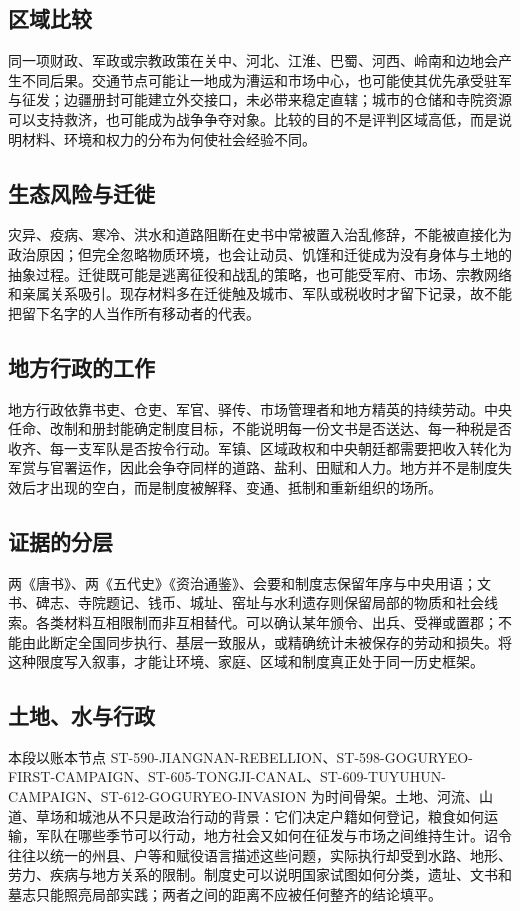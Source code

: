 \subsection{区域比较}
同一项财政、军政或宗教政策在关中、河北、江淮、巴蜀、河西、岭南和边地会产生不同后果。交通节点可能让一地成为漕运和市场中心，也可能使其优先承受驻军与征发；边疆册封可能建立外交接口，未必带来稳定直辖；城市的仓储和寺院资源可以支持救济，也可能成为战争争夺对象。比较的目的不是评判区域高低，而是说明材料、环境和权力的分布为何使社会经验不同。

\subsection{生态风险与迁徙}
灾异、疫病、寒冷、洪水和道路阻断在史书中常被置入治乱修辞，不能被直接化为政治原因；但完全忽略物质环境，也会让动员、饥馑和迁徙成为没有身体与土地的抽象过程。迁徙既可能是逃离征役和战乱的策略，也可能受军府、市场、宗教网络和亲属关系吸引。现存材料多在迁徙触及城市、军队或税收时才留下记录，故不能把留下名字的人当作所有移动者的代表。

\subsection{地方行政的工作}
地方行政依靠书吏、仓吏、军官、驿传、市场管理者和地方精英的持续劳动。中央任命、改制和册封能确定制度目标，不能说明每一份文书是否送达、每一种税是否收齐、每一支军队是否按令行动。军镇、区域政权和中央朝廷都需要把收入转化为军赏与官署运作，因此会争夺同样的道路、盐利、田赋和人力。地方并不是制度失效后才出现的空白，而是制度被解释、变通、抵制和重新组织的场所。

\subsection{证据的分层}
两《唐书》、两《五代史》《资治通鉴》、会要和制度志保留年序与中央用语；文书、碑志、寺院题记、钱币、城址、窑址与水利遗存则保留局部的物质和社会线索。各类材料互相限制而非互相替代。可以确认某年颁令、出兵、受禅或置郡；不能由此断定全国同步执行、基层一致服从，或精确统计未被保存的劳动和损失。将这种限度写入叙事，才能让环境、家庭、区域和制度真正处于同一历史框架。
\subsection{土地、水与行政}
本段以账本节点 ST-590-JIANGNAN-REBELLION、ST-598-GOGURYEO-FIRST-CAMPAIGN、ST-605-TONGJI-CANAL、ST-609-TUYUHUN-CAMPAIGN、ST-612-GOGURYEO-INVASION 为时间骨架。土地、河流、山道、草场和城池从不只是政治行动的背景：它们决定户籍如何登记，粮食如何运输，军队在哪些季节可以行动，地方社会又如何在征发与市场之间维持生计。诏令往往以统一的州县、户等和赋役语言描述这些问题，实际执行却受到水路、地形、劳力、疾病与地方关系的限制。制度史可以说明国家试图如何分类，遗址、文书和墓志只能照亮局部实践；两者之间的距离不应被任何整齐的结论填平。

